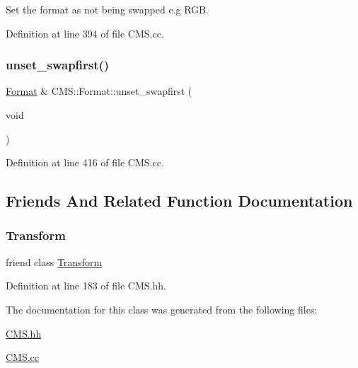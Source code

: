 Set the format as not being swapped e.\+g R\+GB. 



Definition at line 394 of file C\+M\+S.\+cc.

\mbox{\label{class_c_m_s_1_1_format_acd34b91ec29eb33b725007990f2b30d3}} 
\subsubsection{\texorpdfstring{unset\+\_\+swapfirst()}{unset\_swapfirst()}}
{\footnotesize\ttfamily \hyperlink{class_c_m_s_1_1_format}{Format} \& C\+M\+S\+::\+Format\+::unset\+\_\+swapfirst (\begin{DoxyParamCaption}\item[{void}]{ }\end{DoxyParamCaption})}



Definition at line 416 of file C\+M\+S.\+cc.



\subsection{Friends And Related Function Documentation}
\mbox{\label{class_c_m_s_1_1_format_af851b4d9aacd1a871da33592334b8d72}} 
\subsubsection{\texorpdfstring{Transform}{Transform}}
{\footnotesize\ttfamily friend class \hyperlink{class_c_m_s_1_1_transform}{Transform}\hspace{0.3cm}{\ttfamily [friend]}}



Definition at line 183 of file C\+M\+S.\+hh.



The documentation for this class was generated from the following files\+:\begin{DoxyCompactItemize}
\item 
\hyperlink{_c_m_s_8hh}{C\+M\+S.\+hh}\item 
\hyperlink{_c_m_s_8cc}{C\+M\+S.\+cc}\end{DoxyCompactItemize}
